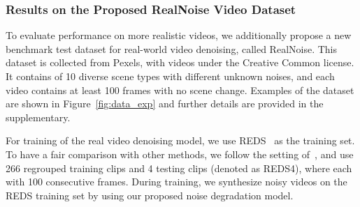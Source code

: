 \documentclass[10pt,twocolumn,letterpaper]{article}
\newlength \g
\begin{document}
\begin{table}[t]
  \caption{Quantitative Comparison of different methods on our RealNoise dataset for the real video denoising task. 
}
\label{tab:real_comp}
  \centering
  \vspace{-6mm}
\end{table}

\vspace{-3mm}
\subsubsection{Results on the Proposed RealNoise Video Dataset}
\vspace{-2mm}
To evaluate performance on more realistic videos, we additionally propose a new benchmark test dataset for real-world video denoising, called RealNoise.
This dataset is collected from Pexels, with videos under the Creative Common license. 
It contains of 10 diverse scene types with different unknown noises, and each video contains at least 100 frames with no scene change.
Examples of the dataset are shown in Figure~\ref{fig:data_exp} and further details are provided in the supplementary.


For training of the real video denoising model, we use REDS~\cite{nah2019reds} as the training set.
To have a fair comparison with other methods, we follow the setting of~\cite{wang2019edvr}, and use 266 regrouped training clips and 4 testing clips (denoted as REDS4), where each with 100 consecutive frames.
During training, we synthesize noisy videos on the REDS training set by using our proposed noise degradation model.
\end{document}
